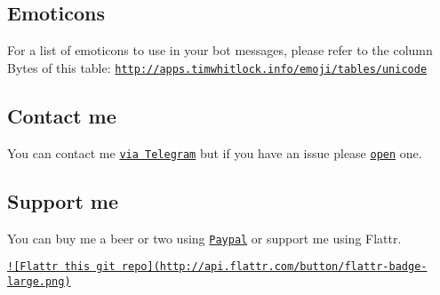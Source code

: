 \subsection*{Emoticons }

For a list of emoticons to use in your bot messages, please refer to the column Bytes of this table\-: \href{http://apps.timwhitlock.info/emoji/tables/unicode}{\tt http\-://apps.\-timwhitlock.\-info/emoji/tables/unicode}

\subsection*{Contact me }

You can contact me \href{https://telegram.me/ggrillo}{\tt via Telegram} but if you have an issue please \href{https://github.com/Eleirbag89/TelegramBotPHP/issues}{\tt open} one.

\subsection*{Support me }

You can buy me a beer or two using \href{https://paypal.me/eleirbag89}{\tt Paypal} or support me using Flattr.

\href{https://flattr.com/submit/auto?user_id=eleirbag89&url=https://github.com/Eleirbag89/TelegramBotPHP&title=TelegramBotPHP&language=&tags=github&category=software}{\tt !\mbox{[}Flattr this git repo\mbox{]}(http\-://api.\-flattr.\-com/button/flattr-\/badge-\/large.\-png)} 